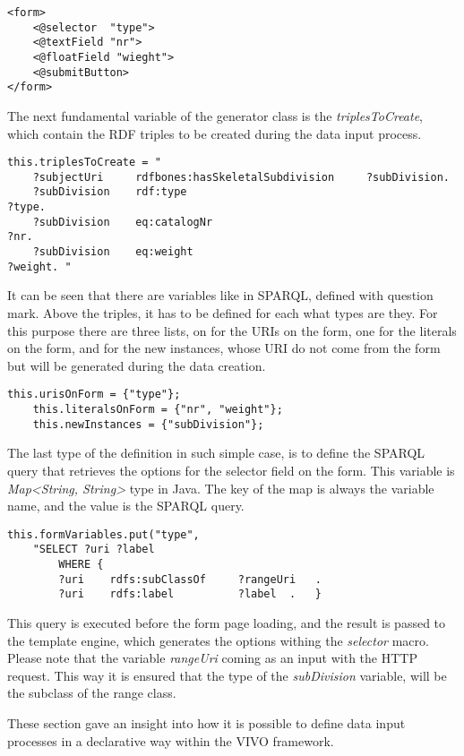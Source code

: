 \begin{lstlisting}[captionpos=b, caption= Convenient form defintion with macros, label=skullJSON, belowskip=1em, aboveskip=2em,
basicstyle=\footnotesize,frame=single]
<form>
	<@selector	"type">
	<@textField	"nr">
	<@floatField "wieght">
	<@submitButton>
</form>	
\end{lstlisting}

The next fundamental variable of the generator class is the \textit{triplesToCreate}, which contain the RDF triples to be created during the data input process. 

\begin{lstlisting}[captionpos=b, caption= RDF Triples to create, label=skullJSON, belowskip=1em, aboveskip=2em,
basicstyle=\footnotesize,frame=single]
this.triplesToCreate = "
	?subjectUri		rdfbones:hasSkeletalSubdivision		?subDivision.
	?subDivision	rdf:type													?type.
	?subDivision	eq:catalogNr											?nr.
	?subDivision	eq:weight													?weight. "
\end{lstlisting}


It can be seen that there are variables like in SPARQL, defined with question mark. Above the triples, it has to be defined for each what types are they. For this purpose there are three lists, on for the URIs on the form, one for the literals on the form, and for the new instances, whose URI do not come from the form but will be generated during the data creation.

\begin{lstlisting}[captionpos=b, caption= Variable type definition, label=skullJSON, belowskip=1em, aboveskip=2em,
basicstyle=\footnotesize,frame=single]
	this.urisOnForm = {"type"};
	this.literalsOnForm	= {"nr", "weight"};
	this.newInstances = {"subDivision"};
\end{lstlisting}


The last type of the definition in such simple case, is to define the SPARQL query that retrieves the options for the selector field on the form. This variable is \textit{Map<String, String>} type in Java. The key of the map is always the variable name, and the value is the SPARQL query.

\begin{lstlisting}[captionpos=b, caption= Query for form data, label=skullJSON, belowskip=1em, aboveskip=2em,
basicstyle=\footnotesize,frame=single]
this.formVariables.put("type", 
	"SELECT ?uri ?label
		WHERE {
		?uri	rdfs:subClassOf		?rangeUri	.
		?uri	rdfs:label			?label	.	}
\end{lstlisting}

This query is executed before the form page loading, and the result is passed to the template engine, which generates the options withing the \textit{selector} macro. Please note that the variable \textit{rangeUri} coming as an input with the HTTP request. This way it is ensured that the type of the \textit{subDivision} variable, will be the subclass of the range class.

These section gave an insight into how it is possible to define data input processes in a declarative way within the VIVO framework.





